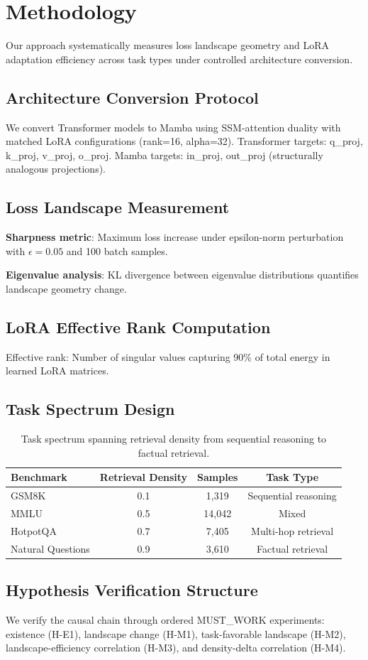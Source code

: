 \section{Methodology}

Our approach systematically measures loss landscape geometry and LoRA adaptation efficiency across task types under controlled architecture conversion.

\subsection{Architecture Conversion Protocol}

We convert Transformer models to Mamba using SSM-attention duality with matched LoRA configurations (rank=16, alpha=32). Transformer targets: q\_proj, k\_proj, v\_proj, o\_proj. Mamba targets: in\_proj, out\_proj (structurally analogous projections).

\subsection{Loss Landscape Measurement}

\textbf{Sharpness metric}: Maximum loss increase under epsilon-norm perturbation with $\epsilon=0.05$ and 100 batch samples.

\textbf{Eigenvalue analysis}: KL divergence between eigenvalue distributions quantifies landscape geometry change.

\subsection{LoRA Effective Rank Computation}

Effective rank: Number of singular values capturing 90\% of total energy in learned LoRA matrices.

\subsection{Task Spectrum Design}

\begin{table}[h]
\centering
\begin{tabular}{lccc}
\toprule
\textbf{Benchmark} & \textbf{Retrieval Density} & \textbf{Samples} & \textbf{Task Type} \\
\midrule
GSM8K & 0.1 & 1,319 & Sequential reasoning \\
MMLU & 0.5 & 14,042 & Mixed \\
HotpotQA & 0.7 & 7,405 & Multi-hop retrieval \\
Natural Questions & 0.9 & 3,610 & Factual retrieval \\
\bottomrule
\end{tabular}
\caption{Task spectrum spanning retrieval density from sequential reasoning to factual retrieval.}
\label{tab:task_spectrum}
\end{table}

\subsection{Hypothesis Verification Structure}

We verify the causal chain through ordered MUST\_WORK experiments: existence (H-E1), landscape change (H-M1), task-favorable landscape (H-M2), landscape-efficiency correlation (H-M3), and density-delta correlation (H-M4).
